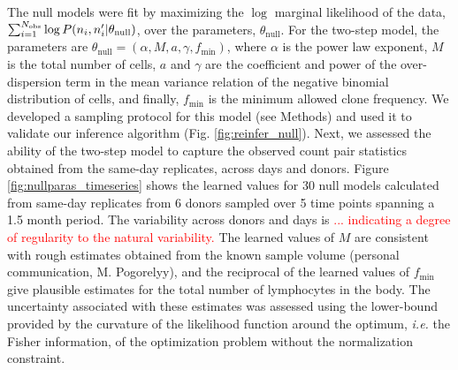 \documentclass[letterpaper,english,prl,reprint,longbibliography]{revtex4-1} %
\begin{document}

The null models were fit by maximizing the $\log$ marginal likelihood of the data, $\sum_{i=1}^{N_{\textrm{\textrm{obs}}}} \log P(n_i,n'_i|\theta_{\text{null}})$, over the parameters, $\theta_{\text{null}}$. 
For the two-step model, the parameters are $\theta_{\text{null}}=(\alpha,M,a,\gamma,f_{\textrm{min}})$, where $\alpha$ is the power law exponent, $M$ is the total number of cells, $a$ and $\gamma$ are the coefficient and power of the over-dispersion term in the mean variance relation of the negative binomial distribution of cells, and finally, $f_{\textrm{min}}$ is the minimum allowed clone frequency.
We developed a sampling protocol for this model (see Methods) and used it to validate our inference algorithm (Fig. \ref{fig:reinfer_null}). Next, we assessed the ability of the two-step model to capture the observed count pair statistics obtained from the same-day replicates, across days and donors. 
Figure \ref{fig:nullparas_timeseries} shows the learned values for 30 null models calculated from same-day replicates from 6 donors sampled over 5 time points spanning a 1.5 month period. 
The variability across donors and days is \textcolor{red}{... indicating a degree of regularity to the natural variability.} 
The learned values of $M$ are consistent with rough estimates obtained from the known sample volume (personal communication, M. Pogorelyy), and the reciprocal of the learned values of $f_{\textrm{min}}$ give plausible estimates for the total number of lymphocytes in the body.
The uncertainty associated with these estimates was assessed using the lower-bound provided by the curvature of the likelihood function around the optimum, \emph{i.e.} the Fisher information, of the optimization problem without the normalization constraint. 
\end{document}
